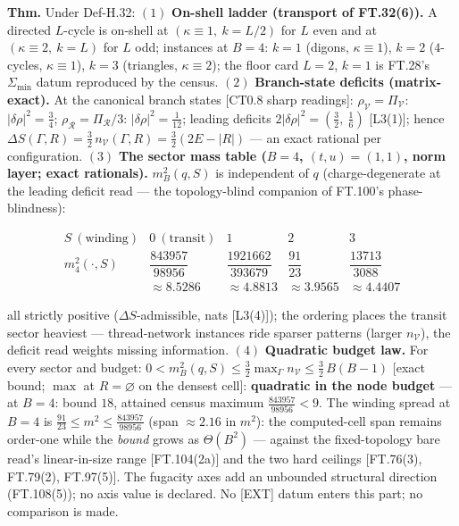 \begin{theorem}\label{tag:FT-107}
\textbf{Thm.} Under Def-H.32: $(1)$ \textbf{On-shell ladder (transport of FT.32(6)).} A directed $L$-cycle is on-shell at $(\kappa\equiv1,\ k=L/2)$ for $L$ even and at $(\kappa\equiv2,\ k=L)$ for $L$ odd; instances at $B=4$: $k=1$ (digons, $\kappa\equiv1$), $k=2$ ($4$-cycles, $\kappa\equiv1$), $k=3$ (triangles, $\kappa\equiv2$); the floor card $L=2$, $k=1$ is FT.28's $\Sigma_{\min}$ datum reproduced by the census. $(2)$ \textbf{Branch-state deficits (matrix-exact).} At the canonical branch states [CT0.8 sharp readings]: $\rho_{\mathcal V}=\Pi_{\mathcal V}$: $|\delta\rho|^2=\tfrac34$; $\rho_{\mathcal R}=\Pi_{\mathcal R}/3$: $|\delta\rho|^2=\tfrac1{12}$; leading deficits $2|\delta\rho|^2=(\tfrac32,\ \tfrac16)$ [L3(1)]; hence $\Delta S(\Gamma,R)=\tfrac32\,n_{\mathcal V}(\Gamma,R)=\tfrac32(2E-|R|)$ — an exact rational per configuration. $(3)$ \textbf{The sector mass table ($B=4$, $(t,u)=(1,1)$, norm layer; exact rationals).} $m^2_B(q,S)$ is independent of $q$ (charge-degenerate at the leading deficit read — the topology-blind companion of FT.100's phase-blindness):

\[
\begin{array}{c|cccc}
S\ (\text{winding})&0\ (\text{transit})&1&2&3\\ \hline
m^2_4(\cdot,S)&\dfrac{843957}{98956}&\dfrac{1921662}{393679}&\dfrac{91}{23}&\dfrac{13713}{3088}\\[2mm]
&\approx8.5286&\approx4.8813&\approx3.9565&\approx4.4407
\end{array}
\]

all strictly positive ($\Delta S$-admissible, nats [L3(4)]); the ordering places the transit sector heaviest — thread-network instances ride sparser patterns (larger $n_{\mathcal V}$), the deficit read weights missing information. $(4)$ \textbf{Quadratic budget law.} For every sector and budget: $0<m^2_B(q,S)\le\tfrac32\max_\Gamma n_{\mathcal V}\le\tfrac32\,B(B-1)$ [exact bound; $\max$ at $R=\varnothing$ on the densest cell]: \textbf{quadratic in the node budget} — at $B=4$: bound $18$, attained census maximum $\tfrac{843957}{98956}<9$. The winding spread at $B=4$ is $\tfrac{91}{23}\le m^2\le\tfrac{843957}{98956}$ (span $\approx2.16$ in $m^2$): the computed-cell span remains order-one while the \textit{bound} grows as $\Theta(B^2)$ — against the fixed-topology bare read's linear-in-size range [FT.104(2a)] and the two hard ceilings [FT.76(3), FT.79(2), FT.97(5)]. The fugacity axes add an unbounded structural direction (FT.108(5)); no axis value is declared. No [EXT] datum enters this part; no comparison is made.


\end{theorem}
